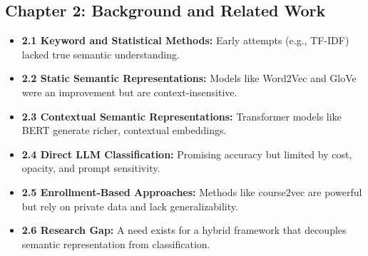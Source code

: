 \documentclass[11pt]{article}
\begin{document}
\subsection*{Chapter 2: Background and Related Work}
\begin{itemize}
    \item \textbf{2.1 Keyword and Statistical Methods:} Early attempts (e.g., TF-IDF) lacked true semantic understanding.
    \item \textbf{2.2 Static Semantic Representations:} Models like Word2Vec and GloVe were an improvement but are context-insensitive.
    \item \textbf{2.3 Contextual Semantic Representations:} Transformer models like BERT generate richer, contextual embeddings.
    \item \textbf{2.4 Direct LLM Classification:} Promising accuracy but limited by cost, opacity, and prompt sensitivity.
    \item \textbf{2.5 Enrollment-Based Approaches:} Methods like course2vec are powerful but rely on private data and lack generalizability.
    \item \textbf{2.6 Research Gap:} A need exists for a hybrid framework that decouples semantic representation from classification.
\end{itemize}
\end{document}
